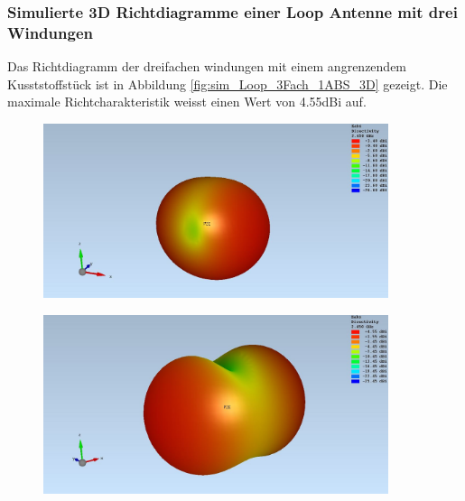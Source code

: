 \subsubsection{Simulierte 3D Richtdiagramme einer Loop Antenne mit drei Windungen}
Das Richtdiagramm der dreifachen windungen mit einem angrenzendem Kusststoffstück ist in Abbildung \ref{fig:sim_Loop_3Fach_1ABS_3D} gezeigt. Die maximale Richtcharakteristik weisst einen Wert von 4.55dBi auf.
\begin{figure}[h]
	\begin{center}
		\begin{minipage}[t]{\textwidth}
			\begin{center}
				\includegraphics[width=0.9\textwidth]{content/bilder/Evaluation/Loop/ohneABS/EM_Far_Field_Loop_Coil_ohneABS.JPG}
				\label{fig:sim_Loop_3Fach_freiraum_3D}
			\end{center}
		\end{minipage}
		\begin{minipage}[t]{\textwidth}
			\begin{center}
				\includegraphics[width=0.9\textwidth]{content/bilder/Evaluation/Loop/Mit1ABS/EM_Far_Filed_Loop_Coil_1ABS.JPG}

\end{center}
\end{minipage}
\end{center}
\end{figure}
